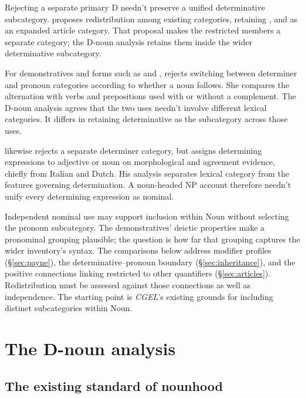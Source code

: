 \documentclass[12pt]{article}
\begin{document}
Rejecting a separate primary D needn't preserve a unified determinative subcategory. \textcite{spinillo2004reconceptualising} proposes redistribution among existing categories, retaining ,  and  as an expanded article category. That proposal makes the restricted members a separate category; the D-noun analysis retains them inside the wider determinative subcategory.

For demonstratives and forms such as  and , \textcite[140--144]{spinillo2004reconceptualising} rejects switching between determiner and pronoun categories according to whether a noun follows. She compares the alternation with verbs and prepositions used with or without a complement. The D-noun analysis agrees that the two uses needn't involve different lexical categories. It differs in retaining determinative as the subcategory across those uses.

\textcite{vaneynde2003determiner} likewise rejects a separate determiner category, but assigns determining expressions to adjective or noun on morphological and agreement evidence, chiefly from Italian and Dutch. His analysis separates lexical category from the features governing determination. A noun-headed NP account therefore needn't unify every determining expression as nominal.

Independent nominal use may support inclusion within Noun without selecting the pronoun subcategory. The demonstratives' deictic properties make a pronominal grouping plausible; the question is how far that grouping captures the wider inventory's syntax. The comparisons below address modifier profiles (§\ref{sec:payne}), the determinative--pronoun boundary (§\ref{sec:inheritance}), and the positive connections linking restricted  to other quantifiers (§\ref{sec:articles}). Redistribution must be assessed against those connections as well as independence. The starting point is \textit{CGEL}'s existing grounds for including distinct subcategories within Noun.

\section{The D-noun analysis}\label{sec:proposal}

\subsection{The existing standard of nounhood}\label{sec:membership}
\end{document}
